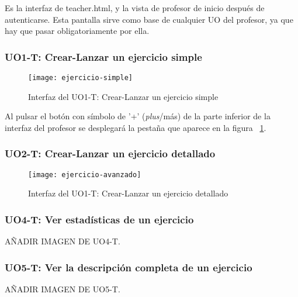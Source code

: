Es la interfaz de teacher.html, y la vista de profesor de inicio después de autenticarse. Esta pantalla sirve como base de cualquier UO del profesor, ya que hay que pasar obligatoriamente por ella.

\subsubsection{UO1-T: Crear-Lanzar un ejercicio simple}
\label{diseno-e-implementacion:interfaces:profesor:uo1-t}

\begin{figure}[H]
	\centering
	\texttt{[image: ejercicio-simple]}
	\caption{Interfaz del UO1-T: Crear-Lanzar un ejercicio simple}
	\label{fig:crear-lanzar-ejercicio-simple}
\end{figure}

Al pulsar el botón con símbolo de '+' (\textit{plus}/más) de la parte inferior de la interfaz del profesor se desplegará la pestaña que aparece en la figura ~\ref{fig:crear-lanzar-ejercicio-simple}.

\subsubsection{UO2-T: Crear-Lanzar un ejercicio detallado}
\label{diseno-e-implementacion:interfaces:profesor:uo2-t}

\begin{figure}[H]
	\centering
	\texttt{[image: ejercicio-avanzado]}
	\caption{Interfaz del UO1-T: Crear-Lanzar un ejercicio detallado}
	\label{fig:crear-lanzar-ejercicio-avanzados}
\end{figure}

\subsubsection{UO4-T: Ver estadísticas de un ejercicio}
\label{diseno-e-implementacion:interfaces:profesor:uo4-t}

AÑADIR IMAGEN DE UO4-T.\\

\subsubsection{UO5-T: Ver la descripción completa de un ejercicio}
\label{diseno-e-implementacion:interfaces:profesor:uo5-t}

AÑADIR IMAGEN DE UO5-T.\\


